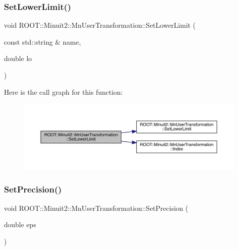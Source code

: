 \mbox{\label{classROOT_1_1Minuit2_1_1MnUserTransformation_aebc0f6d54f3ae5d58b86435529c16796}} 
\subsubsection{\texorpdfstring{SetLowerLimit()}{SetLowerLimit()}\hspace{0.1cm}{\footnotesize\ttfamily [4/4]}}
{\footnotesize\ttfamily void R\+O\+O\+T\+::\+Minuit2\+::\+Mn\+User\+Transformation\+::\+Set\+Lower\+Limit (\begin{DoxyParamCaption}\item[{const std\+::string \&}]{name,  }\item[{double}]{lo }\end{DoxyParamCaption})}

Here is the call graph for this function\+:\nopagebreak
\begin{figure}[H]
\begin{center}
\leavevmode
\includegraphics[width=350pt]{d9/d98/classROOT_1_1Minuit2_1_1MnUserTransformation_aebc0f6d54f3ae5d58b86435529c16796_cgraph}
\end{center}
\end{figure}
\mbox{\label{classROOT_1_1Minuit2_1_1MnUserTransformation_aa80f289974f19753a2912a8eb6311f53}} 
\subsubsection{\texorpdfstring{SetPrecision()}{SetPrecision()}\hspace{0.1cm}{\footnotesize\ttfamily [1/2]}}
{\footnotesize\ttfamily void R\+O\+O\+T\+::\+Minuit2\+::\+Mn\+User\+Transformation\+::\+Set\+Precision (\begin{DoxyParamCaption}\item[{double}]{eps }\end{DoxyParamCaption})\hspace{0.3cm}{\ttfamily [inline]}}

